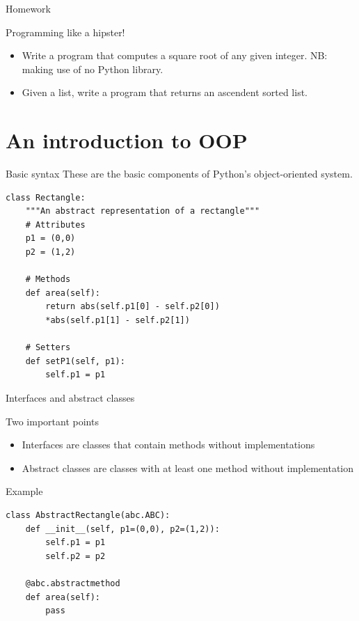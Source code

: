 \documentclass[10pt]{beamer}
\begin{document}
\begin{frame}{Homework}
\begin{block}{Programming like a hipster! }
\vspace*{0.3cm}
\begin{itemize}
	\item Write a program that computes a square root of any given integer. NB: making use of no Python library.
	\item Given a list, write a program that returns an ascendent sorted list.
\end{itemize}
\end{block}
\end{frame}

\section{\textbf{An introduction to OOP}}

\begin{frame}[fragile]{Basic syntax}
These are the basic components of Python's object-oriented system.

\begin{lstlisting}[style=mypython]
class Rectangle:
	"""An abstract representation of a rectangle"""
	# Attributes
	p1 = (0,0)
	p2 = (1,2)

	# Methods
	def area(self):
		return abs(self.p1[0] - self.p2[0]) 
		*abs(self.p1[1] - self.p2[1])
	
	# Setters
	def setP1(self, p1):
		self.p1 = p1
\end{lstlisting}
\end{frame}

\begin{frame}[fragile]{Interfaces and abstract classes}
\begin{block}{Two important points}
\begin{itemize}
	\item Interfaces are classes that contain methods without implementations
	\item Abstract classes are classes with at least one method without implementation
\end{itemize}
\end{block}

\begin{block}{Example}

\vspace{0.5cm}
\begin{lstlisting}[style=mypython]
class AbstractRectangle(abc.ABC):   
	def __init__(self, p1=(0,0), p2=(1,2)):         
		self.p1 = p1
		self.p2 = p2
	
	@abc.abstractmethod
	def area(self): 
		pass 
\end{lstlisting}
\end{block}
\end{frame}
\end{document}
